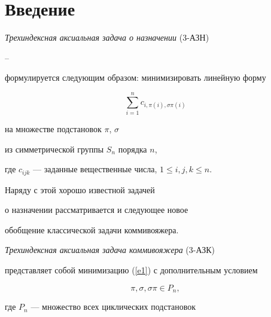 

\maketitle


\label{begin}





\section{Введение}





{\it Трехиндексная аксиальная задача о назначении} (3-АЗН)


\cite{EKK}--\cite{BS91} 


формулируется следующим образом: минимизировать линейную форму 


\begin{equation}


\label{e1}


\sum_{i=1}^{n} c_{i,\pi(i), \sigma \pi (i)}


\end{equation}


на множестве подстановок $\pi$, $\sigma$ 


из симметрической группы $S_n$ порядка $n$,


где $c_{ijk}$ --- заданные вещественные числа, $1 \le i, j, k \le n$.





Наряду с этой хорошо известной задачей


о назначении рассматривается и следующее новое


обобщение классической задачи коммивояжера.





{\it Трехиндексная аксиальная задача коммивояжера} (3-АЗК)


представляет собой минимизацию (\ref{e1}) с дополнительным условием


\begin{equation}


\label {e2}


\pi, \sigma, \sigma \pi \in P_n,


\end{equation}


где $P_n$ --- множество всех циклических подстановок



